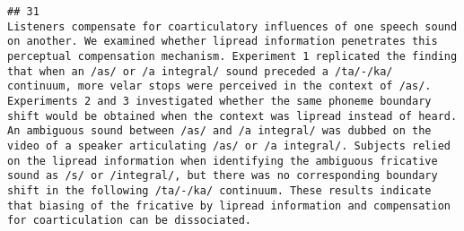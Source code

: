 \documentclass[
  english,
  man]{apa6}
\begin{document}
\begin{verbatim}
## 31                                                                                                                                                                                                                                                                                                                                                                                                                                                                                                                                                                                                                                                                                                                                                                                                                                                                                                                                                                                                                                                                                                                                                                                                                                                                                                                                                                                                                                                                                                                                                                                                                                                                                                              Listeners compensate for coarticulatory influences of one speech sound on another. We examined whether lipread information penetrates this perceptual compensation mechanism. Experiment 1 replicated the finding that when an /as/ or /a integral/ sound preceded a /ta/-/ka/ continuum, more velar stops were perceived in the context of /as/. Experiments 2 and 3 investigated whether the same phoneme boundary shift would be obtained when the context was lipread instead of heard. An ambiguous sound between /as/ and /a integral/ was dubbed on the video of a speaker articulating /as/ or /a integral/. Subjects relied on the lipread information when identifying the ambiguous fricative sound as /s/ or /integral/, but there was no corresponding boundary shift in the following /ta/-/ka/ continuum. These results indicate that biasing of the fricative by lipread information and compensation for coarticulation can be dissociated.

\end{verbatim}
\end{document}
